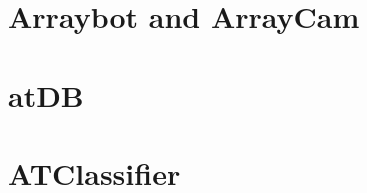 \documentclass[11pt,fleqn]{book} %
\begin{document}
\begin{appendices}
\chapter{Arraybot and ArrayCam}

\chapter{atDB}

\chapter{ATClassifier}


\end{appendices}

%
%
%
%
\end{document}
